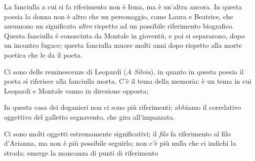 La fanciulla a cui si fa riferimento non è Irma, ma è un'altra ancora. In questa poesia la donna non è altro che un personaggio, come Laura e Beatrice, che assumono un significato \textit{altro} rispetto ad un possibile riferimento biografico. Questa fanciulla è conosciuta da Montale in gioventù, e poi si separarono, dopo un incontro fugace; questa fanciulla muore molti anni dopo rispetto alla morte poetica che le da il poeta.

Ci sono delle reminescenze di Leopardi (\textit{A Silvia}), in quanto in questa poesia il poeta si riferisce alla fanciulla morta. C'è il tema della memoria: è un tema in cui Leopardi e Montale vanno in direzione opposta;


In questa casa dei doganieri non ci sono più riferimenti; abbiamo il correlativo oggettivo del galletto segnavento, che gira all'impazzata.


Ci sono molti oggetti estremamente significativi; il \textit{filo} fa riferimento al filo d'Arianna, ma non è più possibile seguirlo; non c'è più nulla che ci indichi la strada; emerge la mancanza di punti di riferimento


